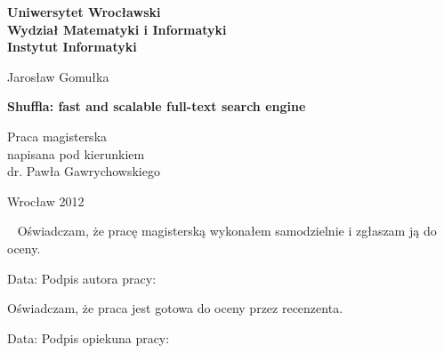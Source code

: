 \documentclass[10pt,a4paper]{article}
\begin{document}


\topmargin-20pt
\textwidth445pt

\begin{titlepage}
\Large

\begin{center}

\textbf{\large%
Uniwersytet Wrocławski\\
Wydział Matematyki i Informatyki\\
Instytut Informatyki}


\vspace{4cm}
Jarosław Gomułka 

\vspace{0.5cm}
\textbf{%
Shuffla: fast and scalable full-text search engine}

\end{center}

\vspace{7cm}
\begin{flushright}
\begin{minipage}[c]{6.2cm}
  Praca magisterska\\
  napisana pod kierunkiem\\
  dr. Pawła Gawrychowskiego
\end{minipage}
\end{flushright}

\vfill

\begin{center}
 Wrocław 2012
\end{center}

\newpage

\end{titlepage}

\newpage

\thispagestyle{empty}

\Large

~\vfill
Oświadczam, że pracę magisterską wykonałem samodzielnie i zgłaszam ją do oceny.

\vspace{2cm}
Data: \dotfill\quad Podpis autora pracy: \dotfill


\vspace{4cm}
Oświadczam, że praca jest gotowa do oceny przez recenzenta.

\vspace{2cm}
Data: \dotfill\quad Podpis opiekuna pracy: \dotfill
\end{document}
